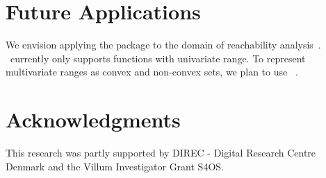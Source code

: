 \documentclass{juliacon}
\begin{document}
\section{Future Applications}
We envision applying the package to the domain of reachability analysis~\cite{althoff2021set, althoff2018implementation}. \emph{\RE}\ currently only supports functions with univariate range. To represent multivariate ranges as convex and non-convex sets, we plan to use ~\cite{ForetsS21}.

\section*{Acknowledgments}

This research was partly supported by DIREC - Digital Research Centre Denmark and the Villum Investigator Grant S4OS.



\end{document}
